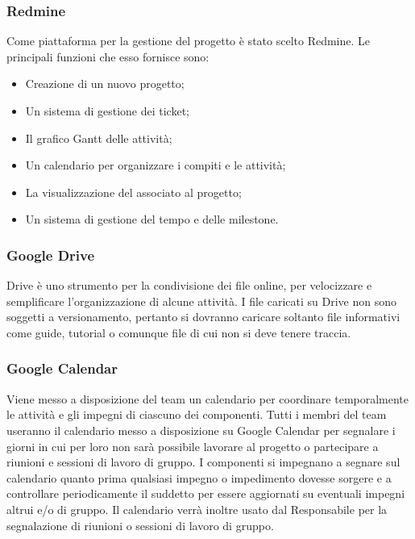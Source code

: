 \subsubsection{Redmine}
\label{4.1}
Come piattaforma per la gestione del progetto è stato scelto Redmine. Le principali funzioni che esso fornisce sono:
\begin{itemize}
\item Creazione di un nuovo progetto;
\item Un sistema di gestione dei ticket;
\item Il grafico Gantt delle attivit\`{a};
\item Un calendario per organizzare i compiti e le attivit\`{a};
\item La visualizzazione del  associato al progetto;
\item Un sistema di  gestione del tempo e delle milestone.
\end{itemize}



\subsubsection{Google Drive}

\label{gdrive}
Drive è uno strumento per la condivisione dei file online, per velocizzare e semplificare l'organizzazione di alcune attivit\`{a}. I file caricati su Drive non sono soggetti a versionamento, pertanto si dovranno caricare soltanto file informativi come guide, tutorial o comunque file di cui non si deve tenere traccia.



\subsubsection{Google Calendar}
\label{4.2}
Viene messo a disposizione del team un calendario per coordinare temporalmente le attivit\`{a} e gli impegni di ciascuno dei componenti.
Tutti i membri del team useranno il calendario messo a disposizione su Google Calendar per segnalare i giorni in cui per loro non sarà possibile lavorare al progetto o partecipare a riunioni e sessioni di lavoro di gruppo. I componenti si impegnano a segnare sul calendario quanto prima qualsiasi impegno o impedimento dovesse sorgere e a controllare periodicamente il suddetto per essere aggiornati su eventuali impegni altrui e/o di gruppo.
Il calendario verrà inoltre usato dal Responsabile per la segnalazione di riunioni o sessioni di lavoro di gruppo.

